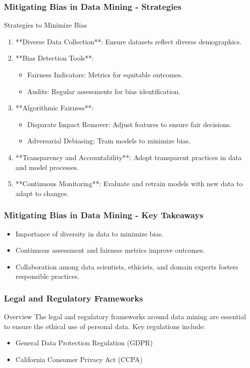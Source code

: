 \documentclass{beamer}
\begin{document}
\begin{frame}[fragile]
    \frametitle{Mitigating Bias in Data Mining - Strategies}
    \begin{block}{Strategies to Minimize Bias}
        \begin{enumerate}
            \item **Diverse Data Collection**: Ensure datasets reflect diverse demographics.
            \item **Bias Detection Tools**:
                \begin{itemize}
                    \item Fairness Indicators: Metrics for equitable outcomes.
                    \item Audits: Regular assessments for bias identification.
                \end{itemize}
            \item **Algorithmic Fairness**:
                \begin{itemize}
                    \item Disparate Impact Remover: Adjust features to ensure fair decisions.
                    \item Adversarial Debiasing: Train models to minimize bias.
                \end{itemize}
            \item **Transparency and Accountability**: Adopt transparent practices in data and model processes.
            \item **Continuous Monitoring**: Evaluate and retrain models with new data to adapt to changes.
        \end{enumerate}
    \end{block}
\end{frame}

\begin{frame}[fragile]
    \frametitle{Mitigating Bias in Data Mining - Key Takeaways}
    \begin{itemize}
        \item Importance of diversity in data to minimize bias.
        \item Continuous assessment and fairness metrics improve outcomes.
        \item Collaboration among data scientists, ethicists, and domain experts fosters responsible practices.
    \end{itemize}
\end{frame}

\begin{frame}[fragile]
    \frametitle{Legal and Regulatory Frameworks}
    \begin{block}{Overview}
        The legal and regulatory frameworks around data mining are essential to ensure the ethical use of personal data. Key regulations include:
        \begin{itemize}
            \item General Data Protection Regulation (GDPR)
            \item California Consumer Privacy Act (CCPA)
        \end{itemize}
    \end{block}
\end{frame}
\end{document}
